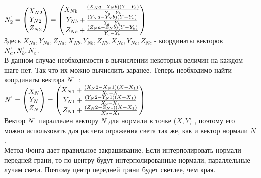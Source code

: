 \documentclass[a4paper, 10pt]{article}
\begin{document}
	\vspace*{1cm}  \hspace*{3cm} $N_2^`=\begin{pmatrix} X_{N2}\\Y_{N2}\\Z_{N2}\end{pmatrix} = 
	\begin{pmatrix} X_{Nb} + \frac{(X_Na - X_Nb)(Y - Y_b)}{Y_a -Y_b}\\
		Y_{Nb} + \frac{(Y_Na - Y_Nb)(Y - Y_b)}{Y_a -Y_b}\\
		Z_{Nb} + \frac{(Z_Na - Z_Nb)(Y - Y_b)}{Y_a -Y_b}\end{pmatrix}$
	\\ \vspace*{0.5cm} Здесь $X_{Na}, Y_{Na}, Z_{Na}, X_{Nb}, Y_{Nb}, Z_{Nb}, X_{Nc}, Y_{Nc}, Z_{Nc}$ - координаты векторов $N_a^`, N_b^`, N_c^`$.
	\\ В данном случае необходимости в вычислении некоторых величин на каждом шаге нет. Так что их можно вычислить заранее. 
	Теперь необходимо найти координаты вектора $N^`$ :
	\\ \vspace*{0.5cm}  \hspace*{3cm} $N^`=\begin{pmatrix} X_{N}\\Y_{N}\\Z_{N}\end{pmatrix} = 
	\begin{pmatrix} X_{N1} + \frac{(X_N2 - X_N1)(X - X_1)}{X_2 -X_1}\\
		Y_{N1} + \frac{(Y_N2 - Y_N1)(X - X_1)}{X_2 -X_1}\\
		Z_{N1} + \frac{(Z_N2 - Z_N1)(X - X_1)}{X_2 -X_1}\end{pmatrix}$
	\\ \vspace*{0.4cm} Вектор $N^`$  параллелен вектору $N$ для нормали в точке ($X, Y$) , поэтому его можно использовать для расчета отражения света так же, как и вектор нормали $N$.
	\\ \hspace*{5mm} Метод Фонга дает правильное закрашивание. Если интерполировать нормали передней грани, то по центру будут интерполированные нормали, параллельные лучам света. Поэтому центр передней грани будет светлее, чем края. 
\end{document}
